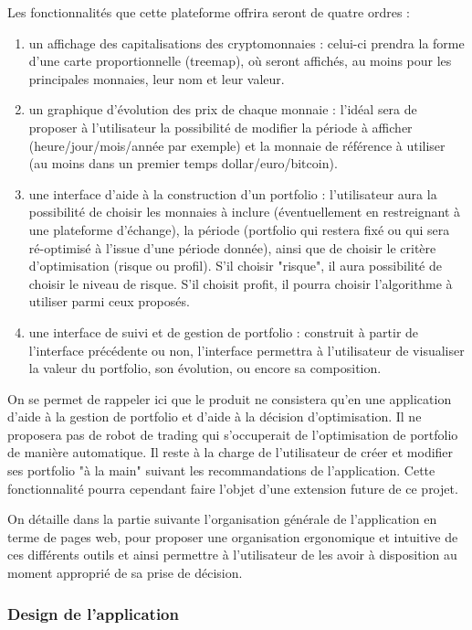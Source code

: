 \documentclass[a4paper]{article}
\begin{document}
Les fonctionnalités que cette plateforme offrira seront de quatre ordres :
\begin{enumerate}
    \item un affichage des capitalisations des cryptomonnaies : celui-ci prendra la forme d'une carte proportionnelle (treemap), où seront affichés, au moins pour les principales monnaies, leur nom et leur valeur.
    \item un graphique d'évolution des prix de chaque monnaie : l'idéal sera de proposer à l'utilisateur la possibilité de modifier la période à afficher (heure/jour/mois/année par exemple) et la monnaie de référence à utiliser (au moins dans un premier temps dollar/euro/bitcoin).
    \item une interface d'aide à la construction d'un portfolio : l'utilisateur aura la possibilité de choisir les monnaies à inclure (éventuellement en restreignant à une plateforme d'échange), la période (portfolio qui restera fixé ou qui sera ré-optimisé à l'issue d'une période donnée), ainsi que de choisir le critère d'optimisation (risque ou profil). S'il choisir "risque", il aura possibilité de choisir le niveau de risque. S'il choisit profit, il pourra choisir l'algorithme à utiliser parmi ceux proposés.
    \item une interface de suivi et de gestion de portfolio : construit à partir de l'interface précédente ou non, l'interface permettra à l'utilisateur de visualiser la valeur du portfolio, son évolution, ou encore sa composition.
\end{enumerate}\medskip

On se permet de rappeler ici que le produit ne consistera qu'en une application d'aide à la gestion de portfolio et d'aide à la décision d'optimisation. Il ne proposera pas de robot de trading qui s'occuperait de l'optimisation de portfolio de manière automatique. Il reste à la charge de l'utilisateur de créer et modifier ses portfolio "à la main" suivant les recommandations de l'application. Cette fonctionnalité pourra cependant faire l'objet d'une extension future de ce projet.

On détaille dans la partie suivante l'organisation générale de l'application en terme de pages web, pour proposer une organisation ergonomique et intuitive de ces différents outils et ainsi permettre à l'utilisateur de les avoir à disposition au moment approprié de sa prise de décision.

\subsubsection{Design de l'application}
\end{document}
